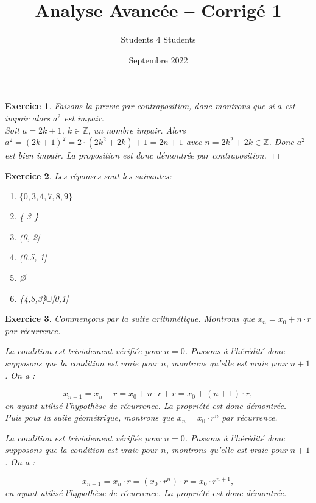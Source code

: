 \documentclass{article}
\title{\textbf{Analyse Avancée -- Corrigé 1}}
\author{Students 4 Students}
\date{Septembre 2022}
\newcommand{\Zz}{{\mathbb{Z}}}
\theoremstyle{exercice}
\newtheorem{exercice}{Exercice}
\begin{document}
\pagestyle{fancy}

\maketitle

\begin{exercice}
    
Faisons la preuve par contraposition, donc montrons que si $a$ est impair alors $a^2$ est impair.\\

Soit $a=2k+1$, $k\in \Zz$, un nombre impair. Alors $a^2=(2k+1)^2=2\cdot(2k^2+2k)+1=2n+1$ avec $n=2k^2+2k\in \Zz$. Donc $a^2$ est bien impair. La proposition est donc démontrée par contraposition.$~~\Box$


\end{exercice}

\begin{exercice}
Les réponses sont les suivantes:

\begin{enumerate}
    \item $\{0,3,4,7,8,9\}$
    \item \{ 3 \}
    \item   (0, 2]
    \item (0.5, 1]
    \item  \O
    \item \{4,8,3\}$\cup$[0,1]
\end{enumerate}

\end{exercice}



\begin{exercice}
    Commençons par la suite arithmétique. Montrons que $x_n=x_0+n\cdot r$ par récurrence.

La condition est trivialement vérifiée pour $n=0$. Passons à l'hérédité donc supposons que la condition est vraie pour $n$, montrons qu'elle est vraie pour $n+1$. On a :

\begin{equation}
    x_{n+1}=x_n+r=x_0+n\cdot r+r=x_0+(n+1)\cdot r,
\end{equation}
en ayant utilisé l'hypothèse de récurrence. La propriété est donc démontrée.\\

Puis pour la suite géométrique, montrons que $x_n=x_0\cdot r^n$ par récurrence.

La condition est trivialement vérifiée pour $n=0$. Passons à l'hérédité donc supposons que la condition est vraie pour $n$, montrons qu'elle est vraie pour $n+1$. On a :

\begin{equation}
    x_{n+1}=x_n\cdot r=(x_0\cdot r^n)\cdot r=x_0\cdot r^{n+1},
\end{equation}
en ayant utilisé l'hypothèse de récurrence. La propriété est donc démontrée.



\end{exercice}
\end{document}
